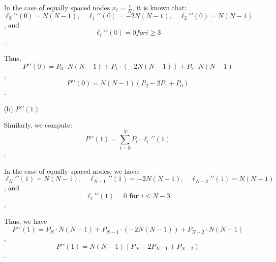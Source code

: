 \documentclass{article}
\begin{document}
{{In the case of equally spaced nodes $x_i = \frac{i}{N}$, it is known that:
$$\ell_0{\prime}{\prime}(0) = N(N-1), \quad \ell_1{\prime}{\prime}(0) = -2N(N-1), \quad \ell_2{\prime}{\prime}(0) = N(N-1)$$,
and $$\ell_i{\prime}{\prime}(0) = 0 for i \geq 3$$.

Thus,
$$P{\prime}{\prime}(0) = P_0 \cdot N(N-1) + P_1 \cdot (-2N(N-1)) + P_2 \cdot N(N-1)$$,
$$P{\prime}{\prime}(0) = N(N-1)(P_2 - 2P_1 + P_0)$$.

(b) $P{\prime}{\prime}(1)$

Similarly, we compute:
$$P{\prime}{\prime}(1) = \sum_{i=0}^{N} P_i \cdot \ell_i{\prime}{\prime}(1)$$.

In the case of equally spaced nodes, we have:
$$\ell_N{\prime}{\prime}(1) = N(N-1), \quad \ell_{N-1}{\prime}{\prime}(1) = -2N(N-1), \quad \ell_{N-2}{\prime}{\prime}(1) = N(N-1)$$,
and $$\ell_i{\prime}{\prime}(1) = 0 \textbf{ for } i \leq N-3$$.

Thus, we have
$$P{\prime}{\prime}(1) = P_N \cdot N(N-1) + P_{N-1} \cdot (-2N(N-1)) + P_{N-2} \cdot N(N-1)$$,
$$P{\prime}{\prime}(1) = N(N-1)(P_N - 2P_{N-1} + P_{N-2})$$.

\ }{}{}}
\end{document}
